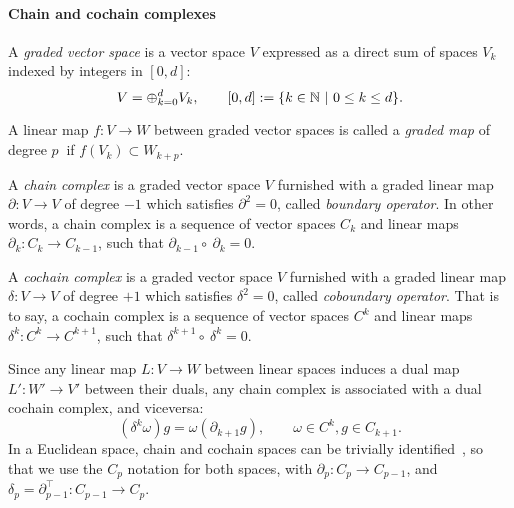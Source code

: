 \paragraph{Chain and cochain complexes}\label{graded-complexes}
%
A \emph{graded vector space} is a vector space $V$ expressed as a direct sum  of
spaces $V_k$ indexed by integers in $[0,d]$:
\[ V = \oplus_{k = 0}^d V_k, \qquad [0,d] := \{k\in\mathbb{N} \ |\ 0\leq k\leq d\}.
\]

A linear map $f:V\to W$ between graded vector spaces is called a \emph{graded
map} of degree $p\ $ if $f(V_k) \subset W_{k+p}$.

A \emph{chain complex} is a graded vector  space $V$ furnished with a graded
linear map $\partial : V \to V$ of degree $-1$ which satisfies $\partial^2 = 0$, called
\emph{boundary operator}. In other words, a chain complex
is a sequence of vector spaces $C_k$ and linear maps $\partial_k : C_k \to C_{k-1}$,
such that $\partial_{k-1} \circ\ \partial_{k} = 0$.

A \emph{cochain complex} is a graded vector space $V$ furnished with a graded
linear map $\delta : V \to V$ of degree $+1$ which satisfies $\delta^2 = 0$,
called \emph{coboundary operator}. That is to say, a cochain complex is a
sequence of vector spaces $C^k$ and linear maps $\delta^k : C^k \to C^{k+1}$,
such that $\delta^{k+1} \circ\ \delta^{k} = 0$.

Since any linear map $L: V\to W$ between linear spaces induces a dual map $L': 
W' \to V'$ between their duals, any chain complex is associated with a dual 
cochain complex, and viceversa:
\[
(\delta^k \omega) g = \omega (\partial_{k+1} g), \qquad \omega \in C^k, g \in C_{k+1}.
\]
 In a Euclidean space, chain and cochain spaces can be trivially identified~\cite{ieee-tase}, so that we use the $C_p$ notation for both spaces, with $\partial_p: C_p\to C_{p-1}$, and $\delta_p = \partial_{p-1}^\top: C_{p-1}\to C_p$.

